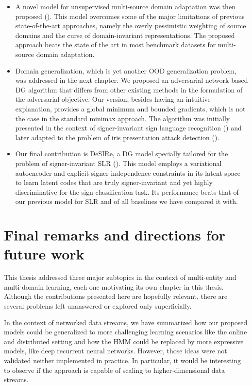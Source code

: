 \begin{itemize}
    \item A novel model for unsupervised multi-source domain adaptation was then proposed (). This model overcomes some of the major limitations of previous state-of-the-art approaches, namely the overly pessimistic weighting of source domains and the curse of domain-invariant representations. The proposed approach beats the state of the art in most benchmark datasets for multi-source domain adaptation.
    \item Domain generalization, which is yet another OOD generalization problem, was addressed in the next chapter. We proposed an adversarial-network-based DG algorithm that differs from other existing methods in the formulation of the adversarial objective. Our version, besides having an intuitive explanation, provides a global minimum and bounded gradients, which is not the case in the standard minimax approach. The algorithm was initially presented in the context of signer-invariant sign language recognition () and later adapted to the problem of iris presentation attack detection ().
    \item Our final contribution is DeSIRe, a DG model specially tailored for the problem of signer-invariant SLR (). This model employs a variational autoencoder and explicit signer-independence constraints in its latent space to learn latent codes that are truly signer-invariant and yet highly discriminative for the sign classification task. Its performance beats that of our previous model for SLR and of all baselines we have compared it with.
\end{itemize}

\section{Final remarks and directions for future work}
This thesis addressed three major subtopics in the context of multi-entity and multi-domain learning, each one motivating its own chapter in this thesis. Although the contributions presented here are hopefully relevant, there are several problems left unanswered or explored only superficially.

In the context of networked data streams, we have summarized how our proposed models could be generalized to more challenging learning scenarios like the online and distributed setting and how the HMM could be replaced by more expressive models, like deep recurrent neural networks. However, those ideas were not validated neither implemented in practice. In particular, it would be interesting to observe if the approach is  capable of scaling to higher-dimensional data streams.

